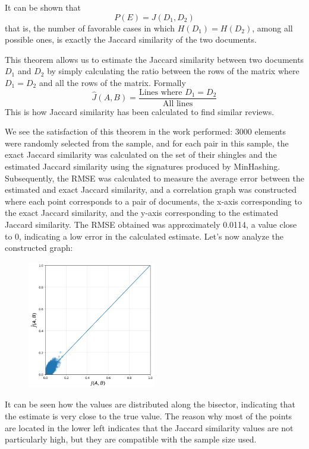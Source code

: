 \documentclass[12pt, a4paper]{article}
\begin{document}
It can be shown that
\begin{equation}
    P(E) = J(D_1, D_2)
\end{equation}
that is, the number of favorable cases in which $H(D_1) = H(D_2)$, among all possible ones, is exactly the Jaccard similarity of the two documents.

This theorem allows us to estimate the Jaccard similarity between two documents $D_1$ and $D_2$ by simply calculating the ratio between the rows of the matrix where $D_1 = D_2$ and all the rows of the matrix. Formally
\begin{equation}
    \hat{J}(A,B) = \frac{\text{Lines where } D_1 = D_2}{\text{All lines}}
\end{equation}
This is how Jaccard similarity has been calculated to find similar reviews.

We see the satisfaction of this theorem in the work performed: 3000 elements were randomly selected from the sample, and for each pair in this sample, the exact Jaccard similarity was calculated on the set of their shingles and the estimated Jaccard similarity using the signatures produced by MinHashing. Subsequently, the RMSE was calculated to measure the average error between the estimated and exact Jaccard similarity, and a correlation graph was constructed where each point corresponds to a pair of documents, the x-axis corresponding to the exact Jaccard similarity, and the y-axis corresponding to the estimated Jaccard similarity. The RMSE obtained was approximately 0.0114, a value close to 0, indicating a low error in the calculated estimate. Let's now analyze the constructed graph:
\begin{figure}[H]
    \centering
    \includegraphics[width=0.5\textwidth]{Screenshot_2.png}
    \label{fig:placeholder}
\end{figure}
It can be seen how the values are distributed along the bisector, indicating that the estimate is very close to the true value. The reason why most of the points are located in the lower left indicates that the Jaccard similarity values are not particularly high, but they are compatible with the sample size used.
\end{document}
